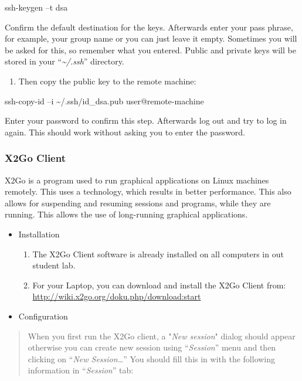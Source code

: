 \documentclass[
]{article}
\begin{document}
ssh-keygen --t dsa

Confirm the default destination for the keys. Afterwards enter your pass
phrase, for example, your group name or you can just leave it empty.
Sometimes you will be asked for this, so remember what you entered.
Public and private keys will be stored in your
``\emph{\textasciitilde/.ssh}'' directory.

\begin{enumerate}
\def\labelenumi{\roman{enumi}.}
\setcounter{enumi}{1}
\item
  Then copy the public key to the remote machine:
\end{enumerate}

ssh-copy-id --i \textasciitilde/.ssh/id\_dsa.pub user@remote-machine

Enter your password to confirm this step. Afterwards log out and try to
log in again. This should work without asking you to enter the password.

\hypertarget{x2go-client}{%
\subsubsection{X2Go Client}\label{x2go-client}}

X2Go is a program used to run graphical applications on Linux machines
remotely. This uses a technology, which results in better performance.
This also allows for suspending and resuming sessions and programs,
while they are running. This allows the use of long-running graphical
applications.

\begin{itemize}
\item
  Installation

  \begin{enumerate}
  \def\labelenumi{\alph{enumi}.}
  \item
    The X2Go Client software is already installed on all computers in
    out student lab.
  \item
    For your Laptop, you can download and install the X2Go Client from:
    \url{http://wiki.x2go.org/doku.php/download:start}
  \end{enumerate}
\item
  Configuration
\end{itemize}

\begin{quote}
When you first run the X2Go client, a "\emph{New session}" dialog should
appear otherwise you can create new session using ``\emph{Session}''
menu and then clicking on ``\emph{New Session\ldots{}}'' You should fill
this in with the following information in ``\emph{Session}'' tab:
\end{quote}
\end{document}
